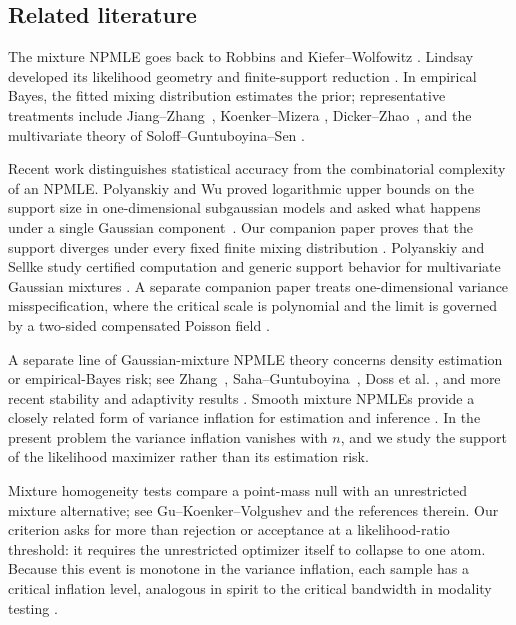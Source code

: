 \documentclass[11pt]{article}
\theoremstyle{remark}
\numberwithin{equation}{section}
\begin{document}
\subsection{Related literature}
\label{sec:related-literature}

The mixture NPMLE goes back to Robbins and Kiefer--Wolfowitz
\cite{robbins1950generalization,kiefer1956consistency}. Lindsay developed its
likelihood geometry and finite-support reduction
\cite{lindsay1983geometryA}. In empirical Bayes, the fitted mixing
distribution estimates the prior; representative treatments include
Jiang--Zhang~\cite{jiang2009general}, Koenker--Mizera
\cite{koenker2014convex}, Dicker--Zhao~\cite{dicker2016high}, and the
multivariate theory of Soloff--Guntuboyina--Sen
\cite{soloff2024multivariate}.

Recent work distinguishes statistical accuracy from the combinatorial
complexity of an NPMLE\@. Polyanskiy and Wu proved logarithmic upper bounds
on the support size in one-dimensional subgaussian models and asked what
happens under a single Gaussian component~\cite{polyanskiy2020self}. Our
companion paper proves that the support diverges under every fixed finite
mixing distribution \cite{supportDivergenceCompanion}. Polyanskiy and Sellke
study certified computation and generic support behavior for multivariate
Gaussian mixtures \cite{polyanskiySellke2025}. A separate companion paper
treats one-dimensional variance misspecification, where the critical scale is
polynomial and the limit is governed by a two-sided compensated Poisson field
\cite{varianceD1Companion}.

A separate line of Gaussian-mixture NPMLE theory concerns density estimation
or empirical-Bayes risk; see Zhang~\cite{zhang2009generalized},
Saha--Guntuboyina~\cite{saha2020nonparametric}, Doss et al.
\cite{doss2020optimal}, and more recent stability and adaptivity results
\cite{zhangVolgushev2026adaptivity,GhoshGuntuboyinaMukherjeeTran2026,
ChenWu2026RegretHellinger}. Smooth mixture NPMLEs provide a closely related
form of variance inflation for estimation and inference
\cite{KimSen2026SmoothNPMLE}. In the present problem the variance inflation
vanishes with $n$, and we study the support of the likelihood maximizer rather
than its estimation risk.

Mixture homogeneity tests compare a point-mass null with an unrestricted
mixture alternative; see Gu--Koenker--Volgushev
\cite{guKoenkerVolgushev2018} and the references therein. Our criterion asks
for more than rejection or acceptance at a likelihood-ratio threshold: it
requires the unrestricted optimizer itself to collapse to one atom. Because
this event is monotone in the variance inflation, each sample has a critical
inflation level, analogous in spirit to the critical bandwidth in modality
testing
\cite{silverman1981multimodality,hallYork2001calibration}.
\end{document}
